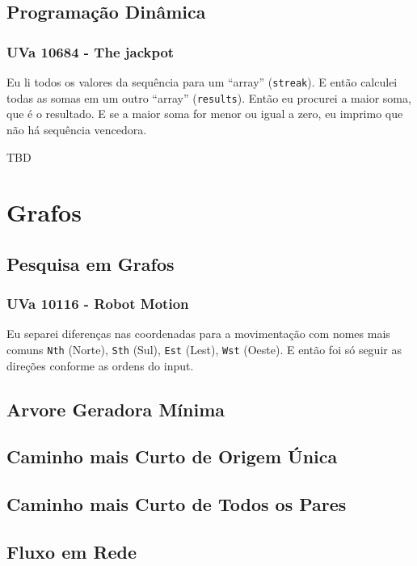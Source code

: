 \documentclass[11pt]{scrartcl}
\newcommand{\code}[1]{\texttt{\colorbox{bg_code_color}{#1}}}
\begin{document}
\subsection{Programação Dinâmica}
\subsubsection{UVa 10684 - The jackpot}
Eu li todos os valores da sequência para um ``array'' (\code{streak}). E então calculei todas as somas em um outro ``array'' (\code{results}). Então eu procurei a maior soma, que é o resultado. E se a maior soma for menor ou igual a zero, eu imprimo que não há sequência vencedora.


TBD


\section{Grafos}

\subsection{Pesquisa em Grafos}
\subsubsection{UVa 10116 - Robot Motion}
Eu separei diferenças nas coordenadas para a movimentação com nomes mais comuns \code{Nth} (Norte), \code{Sth} (Sul), \code{Est} (Lest), \code{Wst} (Oeste). E então foi só seguir as direções conforme as ordens do input.


\subsection{Arvore Geradora Mínima}

\subsection{Caminho mais Curto de Origem Única}

\subsection{Caminho mais Curto de Todos os Pares}

\subsection{Fluxo em Rede}
\end{document}
